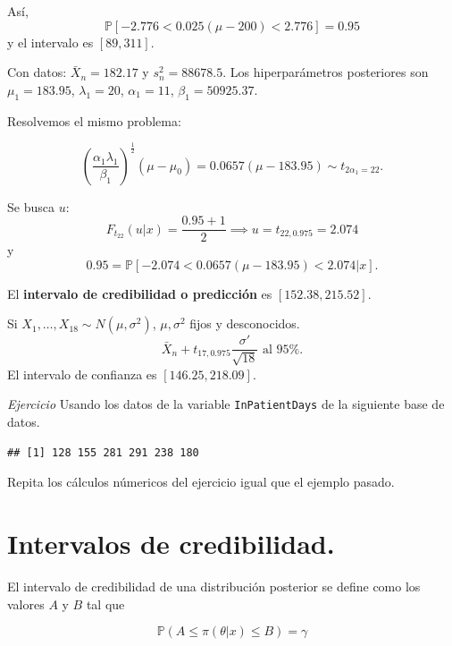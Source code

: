 \documentclass[
  12pt,
]{book}
\newenvironment{Shaded}{\begin{snugshade}}{\end{snugshade}}
\newcommand{\KeywordTok}[1]{\textcolor[rgb]{0.13,0.29,0.53}{\textbf{#1}}}
\newcommand{\NormalTok}[1]{#1}
\newcommand{\OperatorTok}[1]{\textcolor[rgb]{0.81,0.36,0.00}{\textbf{#1}}}
\newcommand{\StringTok}[1]{\textcolor[rgb]{0.31,0.60,0.02}{#1}}
\begin{document}
Así,
\[\mathbb P[-2.776<0.025(\mu-200)<2.776]=0.95\]
y el intervalo es \([89,311]\).

Con datos: \(\bar X_n = 182.17\) y \(s_n^2 = 88678.5\). Los hiperparámetros posteriores son \(\mu_1 = 183.95\), \(\lambda_1 = 20\), \(\alpha_1 = 11\), \(\beta_1 = 50925.37\).

Resolvemos el mismo problema:

\[\left(\dfrac{\alpha_1\lambda_1}{\beta_1}\right)^{\frac 12}(\mu-\mu_0) = 0.0657(\mu - 183.95)\sim t_{2\alpha_1=22}.\]

Se busca \(u\):
\[F_{t_{22}}(u|x) = \dfrac{0.95+1}{2} \implies u = t_{22,0.975}=2.074\]
y
\[0.95 = \mathbb P[-2.074<0.0657(\mu-183.95)<2.074|x].\]

El \textbf{intervalo de credibilidad o predicción} es \([152.38,215.52]\).

Si \(X_1,\dots,X_{18}\sim N(\mu,\sigma^2)\), \(\mu,\sigma^2\) fijos y desconocidos.
\[\bar X_n+t_{17,0.975}\dfrac{\sigma'}{\sqrt {18}} \text{ al }95\%.\]
El intervalo de confianza es \([146.25,218.09]\).

\emph{Ejercicio}
Usando los datos de la variable \texttt{InPatientDays} de
la siguiente base de datos.

\begin{Shaded}
\end{Shaded}

\begin{verbatim}
## [1] 128 155 281 291 238 180
\end{verbatim}

Repita los cálculos númericos del ejercicio igual que el ejemplo pasado.

\hypertarget{intervalos-de-credibilidad.}{%
\section{Intervalos de credibilidad.}\label{intervalos-de-credibilidad.}}

El intervalo de credibilidad de una distribución posterior se define como los
valores \(A\) y \(B\) tal que

\begin{equation*}
\mathbb P (A\leq \pi(\theta\vert x) \leq B) = \gamma
\end{equation*}
\end{document}
